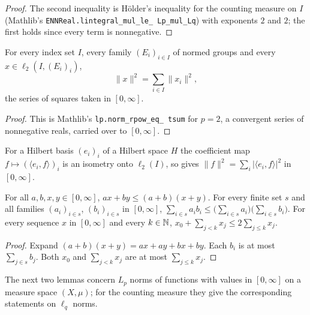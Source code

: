 \begin{proof}
\leanok
The second inequality is Hölder's inequality for the counting measure on $I$ (Mathlib's
\texttt{ENNReal.\allowbreak lintegral\_\allowbreak mul\_\allowbreak le\_\allowbreak
Lp\_\allowbreak mul\_\allowbreak Lq}) with exponents $2$ and $2$; the first holds since every
term is nonnegative.
\end{proof}

\begin{lemma}
\label{lem:l2-norm-sq}
\leanok
For every index set $I$, every family $(E_i)_{i \in I}$ of normed groups and every
$x \in \ell_2(I, (E_i)_i)$,
\[
  \|x\|^2 = \sum_{i \in I} \|x_i\|^2 ,
\]
the series of squares taken in $[0, \infty]$.
\end{lemma}

\begin{proof}
\leanok
This is Mathlib's \texttt{lp.\allowbreak norm\_\allowbreak rpow\_\allowbreak eq\_\allowbreak
tsum} for $p = 2$, a convergent series of nonnegative reals, carried over to $[0, \infty]$.
\end{proof}

For a Hilbert basis $(e_i)_i$ of a Hilbert space $H$ the coefficient map
$f \mapsto (\langle e_i, f \rangle)_i$ is an isometry onto $\ell_2(I)$, so
 gives $\|f\|^2 = \sum_i |\langle e_i, f \rangle|^2$ in $[0, \infty]$.

\begin{lemma}
\label{lem:sum-of-products-le-product-of-sums}
\leanok
For all $a, b, x, y \in [0, \infty]$, $a x + b y \leq (a + b)(x + y)$. For every finite set $s$
and all families $(a_i)_{i \in s}$, $(b_i)_{i \in s}$ in $[0, \infty]$,
$\sum_{i \in s} a_i b_i \leq \bigl(\sum_{i \in s} a_i\bigr)\bigl(\sum_{i \in s} b_i\bigr)$. For
every sequence $x$ in $[0, \infty]$ and every $k \in \mathbb{N}$,
$x_0 + \sum_{j < k} x_j \leq 2 \sum_{j \leq k} x_j$.
\end{lemma}

\begin{proof}
\leanok
Expand $(a + b)(x + y) = a x + a y + b x + b y$. Each $b_i$ is at most $\sum_{j \in s} b_j$.
Both $x_0$ and $\sum_{j < k} x_j$ are at most $\sum_{j \leq k} x_j$.
\end{proof}

The next two lemmas concern $L_p$ norms of functions with values in $[0, \infty]$ on a
measure space $(X, \mu)$; for the counting measure they give the corresponding statements on
$\ell_q$ norms.


